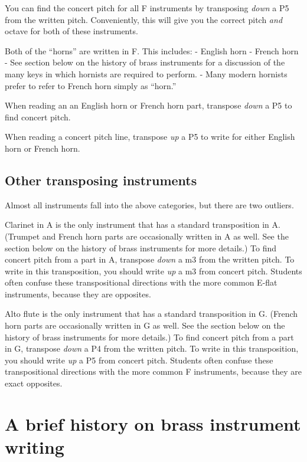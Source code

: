 \documentclass{book}
\begin{document}
You can find the concert pitch for all F instruments by transposing
\emph{down} a P5 from the written pitch. Conveniently, this will give you the
correct pitch \emph{and} octave for both of these instruments.

Both of the ``horns'' are written in F. This includes: - English horn - French
horn - See section below on the history of brass instruments for a discussion
of the many keys in which hornists are required to perform. - Many modern
hornists prefer to refer to French horn simply as ``horn.''

When reading an an English horn or French horn part, transpose \emph{down} a
P5 to find concert pitch.

When reading a concert pitch line, transpose \emph{up} a P5 to write for
either English horn or French horn.

\hypertarget{other-transposing-instruments}{%
\subsection{Other transposing
instruments}\label{other-transposing-instruments}}

Almost all instruments fall into the above categories, but there are two
outliers.

Clarinet in A is the only instrument that has a standard transposition in A.
(Trumpet and French horn parts are occasionally written in A as well. See the
section below on the history of brass instruments for more details.) To find
concert pitch from a part in A, transpose \emph{down} a m3 from the written
pitch. To write in this transposition, you should write \emph{up} a m3 from
concert pitch. Students often confuse these transpositional directions with
the more common E-flat instruments, because they are opposites.

Alto flute is the only instrument that has a standard transposition in G.
(French horn parts are occasionally written in G as well. See the section
below on the history of brass instruments for more details.) To find concert
pitch from a part in G, transpose \emph{down} a P4 from the written pitch. To
write in this transposition, you should write \emph{up} a P5 from concert
pitch. Students often confuse these transpositional directions with the more
common F instruments, because they are exact opposites.

\hypertarget{a-brief-history-on-brass-instrument-writing}{%
\section{A brief history on brass instrument
writing}\label{a-brief-history-on-brass-instrument-writing}}
\end{document}
